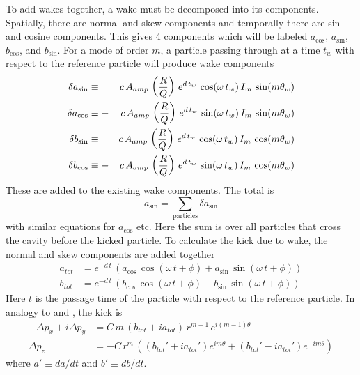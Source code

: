 To add wakes together, a wake must be decomposed into its components.  Spatially, there are normal
and skew components and temporally there are sin and cosine components. This gives 4 components
which will be labeled $a_{\cos}$, $a_{\sin}$, $b_{\cos}$, and $b_{\sin}$. For a mode of order $m$, a
particle passing through at a time $t_w$ with respect to the reference particle will produce wake
components
\begin{alignat}{2}
  \delta a_{\sin} &\equiv  &c \, A_{amp} \, \left( \frac{R}{Q} \right) \,
    e^{d \, t_w} \, \cos (\omega \, t_w) \, I_m \, \sin(m \theta_w) 
    \nonumber \\
  \delta a_{\cos} &\equiv -&c \, A_{amp} \, \left( \frac{R}{Q} \right) \,
    e^{d \, t_w} \, \sin (\omega \, t_w) \, I_m \, \sin(m \theta_w) 
    \label{ac2rq} 
    \\
  \delta b_{\sin} &\equiv  &c \, A_{amp} \, \left( \frac{R}{Q} \right) \,
    e^{d \, t_w} \, \cos (\omega \, t_w) \, I_m \, \cos(m \theta_w) 
    \nonumber \\
  \delta b_{\cos} &\equiv -&c \, A_{amp} \, \left( \frac{R}{Q} \right) \,
    e^{d \, t_w} \, \sin (\omega \, t_w) \, I_m \, \cos(m \theta_w) 
    \nonumber
\end{alignat}
These are added to the existing wake components. The total is
\begin{equation}
  a_{\sin} = \sum_{\text{particles}} \delta a_{\sin}
\end{equation}
with similar equations for $a_{\cos}$ etc. Here the sum is over all particles that cross the
cavity before the kicked particle. To calculate the kick due to wake, the normal and skew components
are added together
\begin{align}
  a_{tot} &= e^{-d \, t} \, \left( 
    a_{\cos} \, \cos (\omega \, t + \phi) + a_{\sin} \, \sin (\omega \, t + \phi) \right) 
    \label{akz2q} \\
  b_{tot} &= e^{-d \, t} \, \left(
    b_{\cos} \, \cos (\omega \, t + \phi) + b_{\sin} \, \sin (\omega \, t + \phi) \right) \nonumber 
\end{align}
Here $t$ is the passage time of the particle with respect to the reference particle. In analogy to
 and , the kick is
\begin{align}
  -\Delta p_x + i\Delta p_y &= C \, 
    m \, (b_{tot} + i a_{tot}) \, r^{m-1} \, e^{i (m-1) \theta} 
    \label{ppcmbar} \\
  \Delta p_z &= -C \, r^m \, \left( 
    (b_{tot}' + i a_{tot}') e^{i m\theta} + (b_{tot}' - i a_{tot}') e^{-i m\theta} \right)
\end{align}
where $a' \equiv da/dt$ and $b' \equiv db/dt$.

